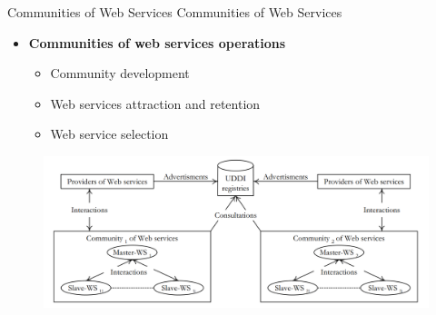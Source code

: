 \documentclass{beamer}
\begin{document}

    \begin{frame}{Communities of Web Services}
        Communities of Web Services
        \begin{itemize}
            \itemsep=.35cm
        	\item \textbf{Communities of web services operations}
            \begin{itemize}
              \item Community development
              \item Web services attraction and retention
              \item Web service selection
            \end{itemize}                      	      	
        \end{itemize}

        \begin{figure}[htbp]
            \centering
            \includegraphics[width=1.0 \columnwidth]{figures/wscommunity2.png}
        \end{figure}
    \end{frame}
\end{document}
